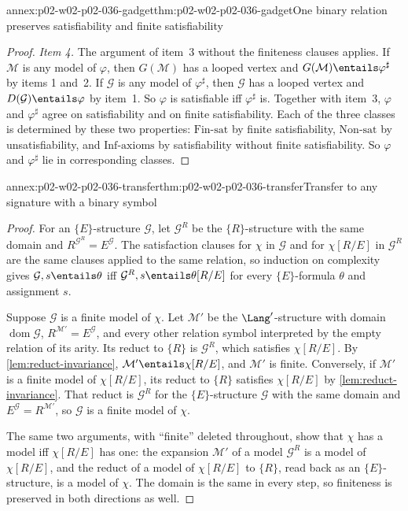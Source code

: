 \begin{annexitem}{annex:p02-w02-p02-036-gadget}{thm:p02-w02-p02-036-gadget}{One binary relation preserves satisfiability and finite satisfiability}
\begin{proof}
\emph{Item 4.}  The argument of item~3 without the finiteness clauses applies.
If \(\mathcal M\) is any model of \(\varphi\), then \(G(\mathcal M)\) has a
looped vertex and \(G(\mathcal M)\entails\varphi^{\sharp}\) by items 1 and~2.
If \(\mathcal G\) is any model of \(\varphi^{\sharp}\), then \(\mathcal G\) has
a looped vertex and \(D(\mathcal G)\entails\varphi\) by item~1.  So \(\varphi\)
is satisfiable iff \(\varphi^{\sharp}\) is.  Together with item~3, \(\varphi\)
and \(\varphi^{\sharp}\) agree on satisfiability and on finite
satisfiability.  Each of the three classes is determined by these two
properties: \(\mathrm{Fin\text{-}sat}\) by finite satisfiability,
\(\mathrm{Non\text{-}sat}\) by unsatisfiability, and
\(\mathrm{Inf\text{-}axioms}\) by satisfiability without finite
satisfiability.  So \(\varphi\) and \(\varphi^{\sharp}\) lie in corresponding
classes.
\end{proof}
\end{annexitem}

\begin{annexitem}{annex:p02-w02-p02-036-transfer}{thm:p02-w02-p02-036-transfer}{Transfer to any signature with a binary symbol}
\begin{proof}
For an \(\{E\}\)-structure \(\mathcal G\), let \(\mathcal G^R\) be the
\(\{R\}\)-structure with the same domain and \(R^{\mathcal G^R}=E^{\mathcal G}\).
The satisfaction clauses for \(\chi\) in \(\mathcal G\) and for \(\chi[R/E]\)
in \(\mathcal G^R\) are the same clauses applied to the same relation, so
induction on complexity gives \(\mathcal G,s\entails\theta\) iff
\(\mathcal G^R,s\entails\theta[R/E]\) for every \(\{E\}\)-formula \(\theta\) and
assignment \(s\).

Suppose \(\mathcal G\) is a finite model of \(\chi\).  Let \(\mathcal M'\) be
the \(\Lang'\)-structure with domain \(\operatorname{dom}\mathcal G\),
\(R^{\mathcal M'}=E^{\mathcal G}\), and every other relation symbol
interpreted by the empty relation of its arity.  Its reduct to \(\{R\}\) is
\(\mathcal G^R\), which satisfies \(\chi[R/E]\).  By
\cref{lem:reduct-invariance}, \(\mathcal M'\entails\chi[R/E]\), and
\(\mathcal M'\) is finite.  Conversely, if \(\mathcal M'\) is a finite model of
\(\chi[R/E]\), its reduct to \(\{R\}\) satisfies \(\chi[R/E]\) by
\cref{lem:reduct-invariance}.  That reduct is \(\mathcal G^R\) for the
\(\{E\}\)-structure \(\mathcal G\) with the same domain and
\(E^{\mathcal G}=R^{\mathcal M'}\), so \(\mathcal G\) is a finite model of
\(\chi\).

The same two arguments, with ``finite'' deleted throughout, show that
\(\chi\) has a model iff \(\chi[R/E]\) has one: the expansion
\(\mathcal M'\) of a model \(\mathcal G^R\) is a model of \(\chi[R/E]\), and
the reduct of a model of \(\chi[R/E]\) to \(\{R\}\), read back as an
\(\{E\}\)-structure, is a model of \(\chi\).  The domain is the same in every
step, so finiteness is preserved in both directions as well.
\end{proof}
\end{annexitem}

